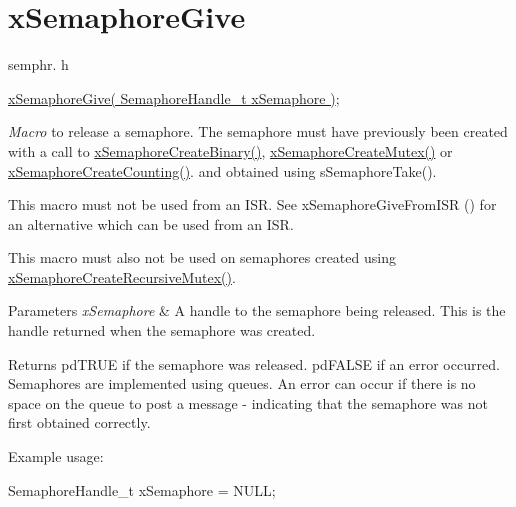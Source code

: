 \hypertarget{group__x_semaphore_give}{}\section{x\+Semaphore\+Give}
\label{group__x_semaphore_give}
semphr. h 
\begin{DoxyPre}
\hyperlink{vendor_2ceedling_2plugins_2freertos_2src_2freertos_2include_2semphr_8h_aae55761cabfa9bf85c8f4430f78c0953}{xSemaphoreGive( SemaphoreHandle\_t xSemaphore )};
\end{DoxyPre}


{\itshape Macro} to release a semaphore. The semaphore must have previously been created with a call to \hyperlink{vendor_2ceedling_2plugins_2freertos_2src_2freertos_2include_2semphr_8h_acba963695e4f159d9bfa2394cae5badc}{x\+Semaphore\+Create\+Binary()}, \hyperlink{vendor_2ceedling_2plugins_2freertos_2src_2freertos_2include_2semphr_8h_aa6a00aa9b91a9e5b3ebe4ae1c3f115c6}{x\+Semaphore\+Create\+Mutex()} or \hyperlink{vendor_2ceedling_2plugins_2freertos_2src_2freertos_2include_2semphr_8h_a7764616a918a46115403569a88148ad4}{x\+Semaphore\+Create\+Counting()}. and obtained using s\+Semaphore\+Take().

This macro must not be used from an I\+SR. See x\+Semaphore\+Give\+From\+I\+SR () for an alternative which can be used from an I\+SR.

This macro must also not be used on semaphores created using \hyperlink{vendor_2ceedling_2plugins_2freertos_2src_2freertos_2include_2semphr_8h_a1bbc843be5a41ea83d2693b2189fc0f8}{x\+Semaphore\+Create\+Recursive\+Mutex()}.


\begin{DoxyParams}{Parameters}
{\em x\+Semaphore} & A handle to the semaphore being released. This is the handle returned when the semaphore was created.\\
\hline
\end{DoxyParams}
\begin{DoxyReturn}{Returns}
pd\+T\+R\+UE if the semaphore was released. pd\+F\+A\+L\+SE if an error occurred. Semaphores are implemented using queues. An error can occur if there is no space on the queue to post a message -\/ indicating that the semaphore was not first obtained correctly.
\end{DoxyReturn}
Example usage\+: 
\begin{DoxyPre}
SemaphoreHandle\_t xSemaphore = NULL;\end{DoxyPre}



